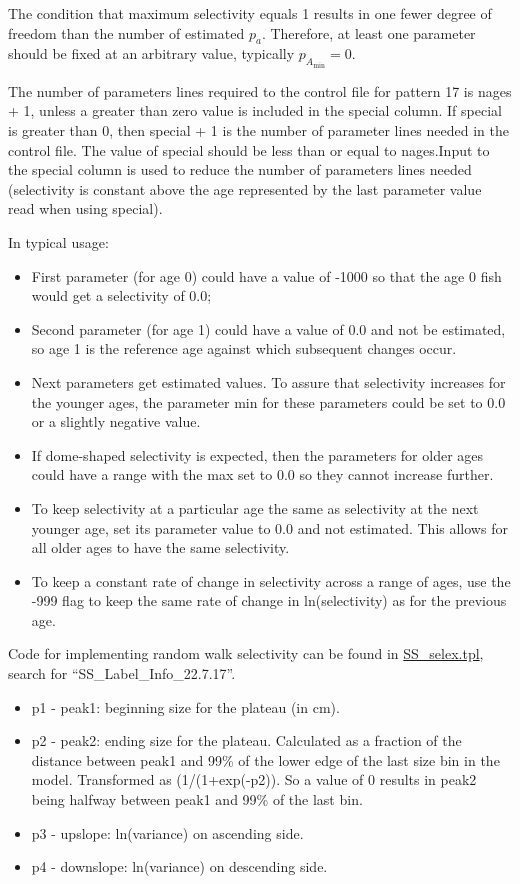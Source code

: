 The condition that maximum selectivity equals 1 results in one fewer degree of freedom than the number of estimated $p_a$. Therefore, at least one parameter should be fixed at an arbitrary value, typically $p_{A_{\text{min}}}=0$.

The number of parameters lines required to the control file for pattern 17 is nages + 1, unless a greater than zero value is included in the special column. If special is greater than 0, then special + 1 is the number of parameter lines needed in the control file. The value of special should be less than or equal to nages.Input to the special column is used to reduce the number of parameters lines needed (selectivity is constant above the age represented by the last parameter value read when using special). 
	
In typical usage:
	\begin{itemize}
		\item First parameter (for age 0) could have a value of -1000 so that the age 0 fish would get a selectivity of 0.0;
		\item Second parameter (for age 1) could have a value of 0.0 and not be estimated, so age 1 is the reference age against which subsequent changes occur.
		\item Next parameters get estimated values. To assure that selectivity increases for the younger ages, the parameter min for these parameters could be set to 0.0 or a slightly negative value.
		\item If dome-shaped selectivity is expected, then the parameters for older ages could have a range with the max set to 0.0 so they cannot increase further.
		\item To keep selectivity at a particular age the same as selectivity at the next younger age, set its parameter value to 0.0 and not estimated. This allows for all older ages to have the same selectivity.
		\item To keep a constant rate of change in selectivity across a range of ages, use the -999 flag to keep the same rate of change in ln(selectivity) as for the previous age.
	\end{itemize}

Code for implementing random walk selectivity can be found in \href{https://github.com/nmfs-ost/ss3-source-code/blob/main/SS_selex.tpl}{SS\_selex.tpl}, search for ``SS\_Label\_Info\_22.7.17''.

	\begin{itemize}
		\item p1 - peak1: beginning size for the plateau (in cm).
		\item p2 - peak2: ending size for the plateau. Calculated as a fraction of the distance between peak1 and 99\% of the lower edge of the last size bin in the model. Transformed as (1/(1+exp(-p2)). So a value of 0 results in peak2 being halfway between peak1 and 99\% of the last bin.
		\item p3 - upslope: ln(variance) on ascending side.
		\item p4 - downslope: ln(variance) on descending side.
	\end{itemize}

